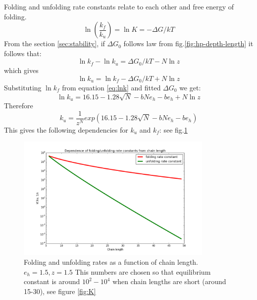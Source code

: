 \documentclass[12pt]{paper}
\newcommand{\gD}{\Delta}
\newcommand{\pt}[1]{\left( #1\right)}
\begin{document}
Folding and unfolding rate constants relate to each other and free energy of folding.
\begin{equation}
 \ln\pt{\frac{k_f}{k_u}}=\ln K=-\gD G/kT
\end{equation} 
From the section \ref{sec:stability}, if $\gD G_0$ follows law from fig.\ref{fig:hp-depth-length}  
it follows that:
\begin{equation}
\ln k_f-\ln k_u=\gD G_0/kT-N\ln z%
\end{equation} 
which gives
\begin{equation}
\ln k_u = \ln k_f -\gD G_0/kT+N\ln z 
\end{equation} 
Substituting $\ln k_f $ from equation \eqref{eq:lnk} and fitted $\gD G_0$ we get:
\begin{equation}
\ln k_u = 16.15-1.28 \sqrt{N} -bNe_h -be_h+N\ln z
\end{equation} 
Therefore
\begin{equation}
k_u = \frac{1}{z^N}exp(16.15-1.28 \sqrt{N} -bNe_h -be_h)
\end{equation} 
This gives the following dependencies for $k_u$ and $k_f$: see fig.\ref{fig:k_unf_N}
\begin{figure}[h!]
  \centering
  \includegraphics[width=0.85\textwidth]{pictures/kf-ku.png} 
  \caption{Folding and unfolding rates as a function of chain length. $e_h=1.5,z=1.5$ This numbers 
are chosen so that equilibrium constant is around $10^2-10^4$ when chain lengths are short (around 
15-30), see figure \ref{fig:K}}
  \label{fig:k_unf_N}
\end{figure}
\end{document}
